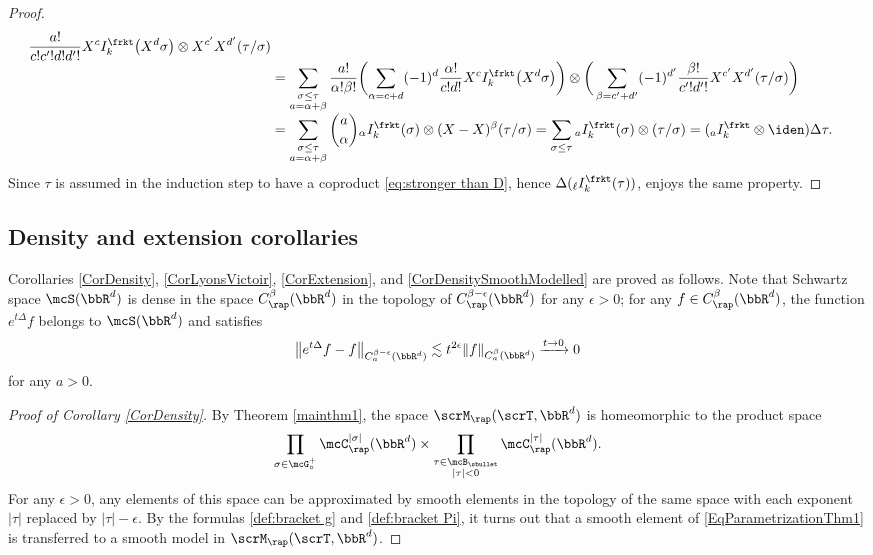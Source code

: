 \begin{proof}
\begin{align*}
\frac{a!}{c!c'!d!d'!}
X^c I_k^\frkt\bigl(X^d\sigma\bigr)
\otimes
X^{c'} X^{d'}(\tau/\sigma) \\[-3pt]
&=\sum_{\substack{\sigma\le\tau \\ a=\alpha+\beta}}\frac{a!}{\alpha!\beta!}
\biggl(\sum_{\alpha=c+d}(-1)^{d}
\frac{\alpha!}{c!d!}
X^c I_k^\frkt\bigl(X^d\sigma\bigr)\biggr)
\otimes
\bigg(\sum_{\beta=c'+d'}(-1)^{d'}\frac{\beta!}{c'!d'!}
X^{c'} X^{d'}(\tau/\sigma)\bigg)\\[-3pt]
&=\sum_{\substack{\sigma\le\tau \\ a=\alpha+\beta}}\binom{a}{\alpha}
{}_{\alpha} I_k^\frkt(\sigma)
\otimes
(X-X)^\beta(\tau/\sigma)=\sum_{\sigma\le\tau}
{}_{a} I_k^\frkt(\sigma)
\otimes
(\tau/\sigma)
=({}_{a} I_k^\frkt\otimes\iden)\Delta\tau.
\end{align*}
Since $\tau$ is assumed in the induction step to have a coproduct \eqref{eq:stronger than D}, hence $\Delta( {}_{\ell} I_k^\frkt(\tau))$, enjoys the same property.
\end{proof}

\subsection{Density and extension corollaries}
\label{SubsectionCorollaries}

Corollaries \ref{CorDensity}, \ref{CorLyonsVictoir}, \ref{CorExtension}, and \ref{CorDensitySmoothModelled} are proved as follows. Note that Schwartz space $\mcS(\bbR^d)$ is dense in the space $C_{\rap}^\beta(\bbR^d)$ in the topology of $C_{\rap}^{\beta-\epsilon}(\bbR^d)$ for any $\epsilon>0$; for any $f\in C_{\rap}^\beta(\bbR^d)$, the function $e^{t\Delta}f$ belongs to $\mcS(\bbR^d)$ and satisfies
\[
\big\|e^{t\Delta}f - f \big\|_{C_a^{\beta-\epsilon}(\bbR^d)}\lesssim t^{2\epsilon}\|f\|_{C_a^\beta(\bbR^d)}
\xrightarrow{t\to0}0
\]
for any $a>0$.

\begin{proof}[Proof of Corollary \ref{CorDensity}]
By Theorem \ref{mainthm1}, the space $\scrM_{\rap}(\scrT,\bbR^d)$ is homeomorphic to the product space
\begin{align*}
\prod_{\sigma\in\mcG_\circ^+} \mcC_\rap^{|\sigma|}(\bbR^d) \times \prod_{\substack{\tau\in\mcB_\sbullet\\|\tau|<0}} \mcC_\rap^{|\tau|}(\bbR^d).
\end{align*}
For any $\epsilon>0$, any elements of this space can be approximated by smooth elements in the topology of the same space with each exponent $|\tau|$ replaced by $|\tau|-\epsilon$. By the formulas \eqref{def:bracket g} and \eqref{def:bracket Pi}, it turns out that a smooth element of \eqref{EqParametrizationThm1} is transferred to a smooth model in $\scrM_{\rap}(\scrT,\bbR^d)$.
\end{proof}

